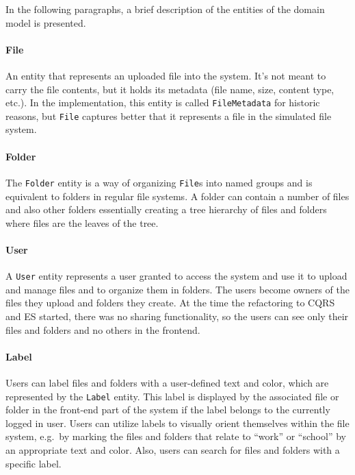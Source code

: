 \documentclass{book}
\begin{document}
In the following paragraphs, a brief description of the entities of the
domain model is presented.

\paragraph{File}\label{file}

An entity that represents an uploaded file into the system. It's not
meant to carry the file contents, but it holds its metadata (file name,
size, content type, etc.). In the implementation, this entity is called
\texttt{FileMetadata} for historic reasons, but \texttt{File} captures
better that it represents a file in the simulated file system.

\paragraph{Folder}\label{folder}

The \texttt{Folder} entity is a way of organizing \texttt{File}s into
named groups and is equivalent to folders in regular file systems. A
folder can contain a number of files and also other folders essentially
creating a tree hierarchy of files and folders where files are the
leaves of the tree.

\paragraph{User}\label{user}

A \texttt{User} entity represents a user granted to access the system
and use it to upload and manage files and to organize them in folders.
The users become owners of the files they upload and folders they
create. At the time the refactoring to CQRS and ES started, there was no
sharing functionality, so the users can see only their files and folders
and no others in the frontend.

\paragraph{Label}\label{label}

Users can label files and folders with a user-defined text and color,
which are represented by the \texttt{Label} entity. This label is
displayed by the associated file or folder in the front-end part of the
system if the label belongs to the currently logged in user. Users can
utilize labels to visually orient themselves within the file system,
e.g.~by marking the files and folders that relate to ``work'' or
``school'' by an appropriate text and color. Also, users can search for
files and folders with a specific label.
\end{document}
